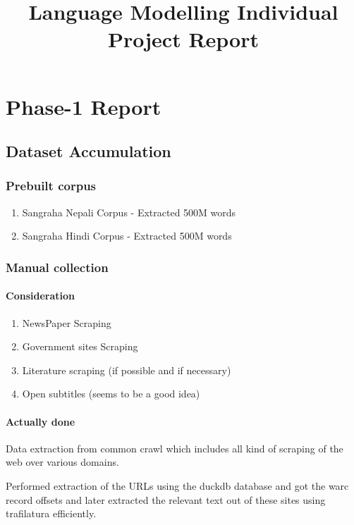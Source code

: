 \documentclass[10pt,a4paper]{article}
\title{Language Modelling Individual Project Report}
\author{}
\date{}
\begin{document}
\maketitle
\section{Phase-1 Report}

\subsection{Dataset Accumulation}
\subsubsection{Prebuilt corpus}
\begin{enumerate}
\item Sangraha Nepali Corpus - Extracted 500M words
\item Sangraha Hindi Corpus - Extracted 500M words
\end{enumerate}

\subsubsection{Manual collection}
\paragraph{Consideration}
\begin{enumerate}
\item NewsPaper Scraping
\item Government sites Scraping
\item Literature scraping (if possible and if necessary)
\item Open subtitles (seems to be a good idea)
\end{enumerate}

\paragraph{Actually done}
Data extraction from common crawl which includes all kind
of scraping of the web over various domains.

Performed extraction of the URLs using the duckdb database and
got the warc record offsets and later extracted the relevant
text out of these sites using trafilatura efficiently.
\end{document}
